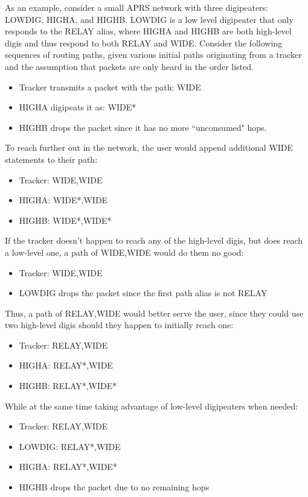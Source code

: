 As an example, consider a small APRS network with three digipeaters: LOWDIG, HIGHA, and HIGHB.
LOWDIG is a low level digipeater that only responds to the RELAY alias, 
where HIGHA and HIGHB are both high-level digis and thus respond to both RELAY and WIDE.
Consider the following sequences of routing paths,
given various initial paths originating from a tracker and the assumption that packets are only
heard in the order listed.
\begin{itemize}
	\item Tracker transmits a packet with the path: WIDE
	\item HIGHA digipeats it as: WIDE*
	\item HIGHB drops the packet since it has no more ``unconsumed" hops.
\end{itemize}
To reach further out in the network, the user would append additional WIDE statements to their path:

\begin{itemize}
	\item Tracker: WIDE,WIDE
	\item HIGHA: WIDE*,WIDE
	\item HIGHB: WIDE*,WIDE*
\end{itemize}

If the tracker doesn't happen to reach any of the high-level digis, 
but does reach a low-level one, a path of WIDE,WIDE would do them no good:

\begin{itemize}
	\item Tracker: WIDE,WIDE
	\item LOWDIG drops the packet since the first path alias is not RELAY
\end{itemize}

Thus, a path of RELAY,WIDE would better serve the user,
since they could use two high-level digis should they happen to initially reach one:

\begin{itemize}
	\item Tracker: RELAY,WIDE
	\item HIGHA: RELAY*,WIDE
	\item HIGHB: RELAY*,WIDE*
\end{itemize}

While at the same time taking advantage of low-level digipeaters when needed:
\begin{itemize}
	\item Tracker: RELAY,WIDE
	\item LOWDIG: RELAY*,WIDE
	\item HIGHA: RELAY*,WIDE*
	\item HIGHB drops the packet due to no remaining hops
\end{itemize}

